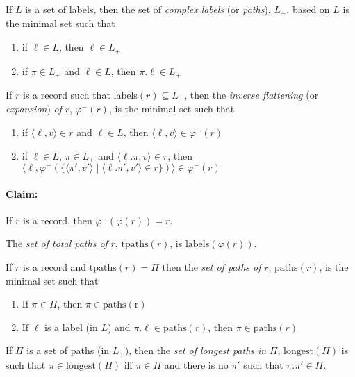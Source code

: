 If $L$ is a set of labels,
then the set of \textit{complex labels} (or \textit{paths}), $L_+$,
based on $L$ is the minimal set such that
\begin{enumerate} 
 
\item if $\ell\in L$, then $\ell\in L_+$ 
 
\item if $\pi\in L_+$ and $\ell\in L$, then $\pi.\ell\in L_+$ 
 
\end{enumerate}

If $r$ is a record such that $\mathrm{labels}(r)\subseteq L_+$, then
the \textit{inverse flattening} (or \textit{expansion}) \textit{of}
$r$, $\varphi^-(r)$, is the minimal set such that
\begin{enumerate} 
 
\item if $\langle\ell,v\rangle\in r$ and $\ell\in L$, then $\langle\ell,v\rangle\in\varphi^-(r)$ 
 
\item if $\ell\in L$, $\pi\in L_+$ and $\langle\ell.\pi,v\rangle\in
  r$, then 
$\langle\ell,\varphi^-(\{\langle\pi',v'\rangle\mid\langle\ell.\pi',v'\rangle\in r\})\rangle\in\varphi^-(r)$
 
\end{enumerate}

\paragraph{Claim:} If $r$ is a record, then $\varphi^-(\varphi(r))=r$.

The \textit{set of total paths of} $r$, $\mathrm{tpaths}(r)$, is
$\mathrm{labels}(\varphi(r))$.

If $r$ is a record and $\mathrm{tpaths}(r)=\Pi$ then the \textit{set
  of paths of} $r$, $\mathrm{paths}(r)$, is the minimal set such that
\begin{enumerate} 
 
\item If $\pi\in\Pi$, then $\pi\in\mathrm{paths(r)}$ 
 
\item If $\ell$ is a label (in $L$) and
  $\pi.\ell\in\mathrm{paths}(r)$, then $\pi\in\mathrm{paths}(r)$ 
 
\end{enumerate} 

If $\Pi$ is a set of paths (in $L_+$), then the \textit{set of longest
  paths in} $\Pi$, $\mathrm{longest}(\Pi)$ is such that
$\pi\in\mathrm{longest}(\Pi)$ iff $\pi\in\Pi$ and there is no $\pi'$
such that $\pi.\pi'\in\Pi$.

